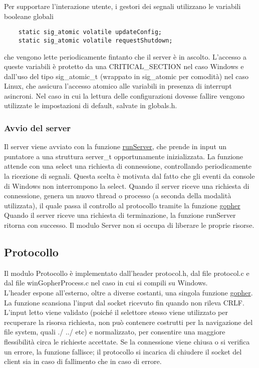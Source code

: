\documentclass{article}
\begin{document}
Per supportare l'interazione utente, i gestori dei segnali utilizzano le variabili booleane globali
\begin{lstlisting}
    static sig_atomic volatile updateConfig;
    static sig_atomic volatile requestShutdown;
\end{lstlisting}
che vengono lette periodicamente fintanto che il server è in ascolto. L'accesso a queste variabili è 
protetto da una CRITICAL\_SECTION nel caso Windows e dall'uso del tipo sig\_atomic\_t (wrappato in sig\_atomic per comodità)
nel caso Linux, che assicura l'accesso atomico alle variabili in presenza di interrupt asincroni.
Nel caso in cui la lettura delle configurazioni dovesse fallire vengono utilizzate le 
impostazioni di default, salvate in globals.h.

\subsubsection{Avvio del server}

Il server viene avviato con la funzione \href{html/server_8h.html#a533c9a4292e9d1106ff7c54fbf75090a}{runServer},
che prende in input un puntatore a una struttura server\_t opportunamente inizializzata.
La funzione attende con una select una richiesta di connessione, controllando periodicamente la ricezione
di segnali. Questa scelta è motivata dal fatto che gli eventi da console di Windows non interrompono la select.
Quando il server riceve una richiesta di connessione, genera un nuovo thread o processo (a seconda della modalità
utilizzata), il quale passa il controllo al protocollo tramite la funzione \href{html/protocol_8h.html#a733e68cc8d5f947c30d0ca51e1b76d9b}
{gopher} Quando il server riceve una richiesta di terminazione, 
la funzione runServer ritorna con successo. Il modulo Server non si occupa di liberare le proprie risorse.

\subsection{Protocollo}

Il modulo Protocollo è implementato dall'header protocol.h, dal file protocol.c e dal file winGopherProcess.c 
nel caso in cui si compili su Windows.\\
L'header espone all'esterno, oltre a diverse costanti, una singola funzione \href{html/protocol_8h.html#a733e68cc8d5f947c30d0ca51e1b76d9b}{gopher}.
La funzione scansiona l'input dal socket ricevuto fin quando non rileva CRLF.
L'input letto viene validato (poiché il selettore stesso viene utilizzato per recuperare la risorsa
richiesta, non può contenere costrutti per la navigazione del file system, quali ./ ../ etc) e normalizzato,
per consentire una maggiore flessibilità circa le richieste accettate.
Se la connessione viene chiusa o si verifica un errore, la funzione fallisce;
il protocollo si incarica di chiudere il socket del client sia in caso di fallimento che in caso di errore.
\end{document}
